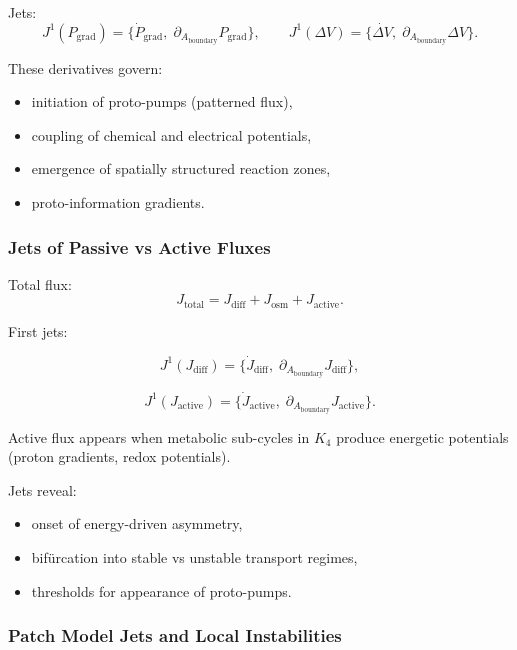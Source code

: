 Jets:
\[
J^1(P_{\mathrm{grad}})=
\{\dot{P}_{\mathrm{grad}},\;\partial_{A_{\mathrm{boundary}}}P_{\mathrm{grad}}\},
\qquad
J^1(\Delta V)=
\{\dot{\Delta V},\;\partial_{A_{\mathrm{boundary}}}\Delta V\}.
\]

These derivatives govern:

\begin{itemize}
    \item initiation of proto-pumps (patterned flux),
    \item coupling of chemical and electrical potentials,
    \item emergence of spatially structured reaction zones,
    \item proto-information gradients.
\end{itemize}


\subsubsection{Jets of Passive vs Active Fluxes}

Total flux:
\[
J_{\mathrm{total}} 
= 
J_{\mathrm{diff}} + J_{\mathrm{osm}} + J_{\mathrm{active}}.
\]

First jets:

\[
J^1(J_{\mathrm{diff}})=
\{\dot{J}_{\mathrm{diff}},\;\partial_{A_{\mathrm{boundary}}}J_{\mathrm{diff}}\},
\]

\[
J^1(J_{\mathrm{active}})=
\{\dot{J}_{\mathrm{active}},\;\partial_{A_{\mathrm{boundary}}}J_{\mathrm{active}}\}.
\]

Active flux appears when metabolic sub-cycles in $K_4$ produce energetic
potentials (proton gradients, redox potentials).

Jets reveal:

\begin{itemize}
    \item onset of energy-driven asymmetry,
    \item bifürcation into stable vs unstable transport regimes,
    \item thresholds for appearance of proto-pumps.
\end{itemize}


\subsubsection{Patch Model Jets and Local Instabilities}

